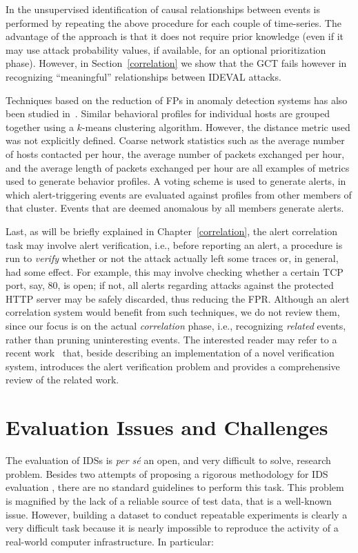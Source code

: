 In \citep{dblp:conf/raid/qinl03} the unsupervised identification of
causal relationships between events is performed by repeating the
above procedure for each couple of time-series. The advantage of the
approach is that it does not require prior knowledge (even if it may
use attack probability values, if available, for an optional
prioritization phase). However, in Section~\ref{correlation} we show
that the \ac{GCT} fails however in recognizing
``meaningful'' relationships between \ac{IDEVAL}
attacks.

Techniques based on the reduction of \acp{FP} in anomaly
detection systems has also been studied
in~\citep{martinez:acsac2008:clustering}. Similar behavioral profiles
for individual hosts are grouped together using a $k$-means clustering
algorithm. However, the distance metric used was not explicitly
defined. Coarse network statistics such as the average number of hosts
contacted per hour, the average number of packets exchanged per hour,
and the average length of packets exchanged per hour are all examples
of metrics used to generate behavior profiles. A voting scheme is used
to generate alerts, in which alert-triggering events are evaluated
against profiles from other members of that cluster. Events that are
deemed anomalous by all members generate alerts.

Last, as will be briefly explained in Chapter~\ref{correlation}, the
alert correlation task may involve alert verification, i.e., before
reporting an alert, a procedure is run to \emph{verify} whether or not
the attack actually left some traces or, in general, had some
effect. For example, this may involve checking whether a certain
\ac{TCP} port, say, 80, is open; if not, all alerts regarding attacks
against the protected \ac{HTTP} server may be safely discarded, thus
reducing the \ac{FPR}. Although an alert correlation system would
benefit from such techniques, we do not review them, since our focus
is on the actual \emph{correlation} phase, i.e., recognizing
\emph{related} events, rather than pruning uninteresting events. The
interested reader may refer to a recent work~\citep{1349438} that,
beside describing an implementation of a novel verification system,
introduces the alert verification problem and provides a comprehensive
review of the related work.

\section{Evaluation Issues and Challenges}
\label{detection:evaluation:issues} The evaluation of
\acp{IDS} is \emph{per s\'e} an open, and very difficult to
solve, research problem. Besides two attempts of proposing a rigorous
methodology for \ac{IDS} evaluation
\citep{puketza96methodology,puketza97software}, there are no standard
guidelines to perform this task. This problem is magnified by the lack
of a reliable source of test data, that is a well-known
issue. However, building a dataset to conduct repeatable experiments
is clearly a very difficult task because it is nearly impossible to
reproduce the activity of a real-world computer infrastructure. In
particular:

